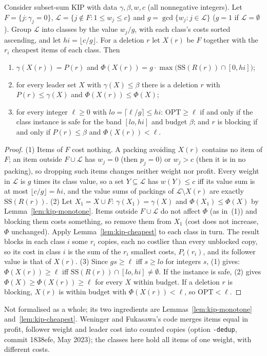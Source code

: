 \begin{proposition}\label{prop:kip-reduction}
Consider subset-sum KIP with data $\gamma,\beta,w,c$ (all nonnegative
integers). Let $F=\{j:\gamma_j=0\}$, $\mathcal{L}=\{j\notin F: 1\le w_j\le c\}$ and
$g=\gcd\{w_j: j\in\mathcal{L}\}$ ($g=1$ if $\mathcal{L}=\emptyset$). Group
$\mathcal{L}$ into classes by the value $w_j/g$, with each class's costs sorted
ascending, and let $hi=\lfloor c/g\rfloor$. For a deletion $r$ let $X(r)$ be $F$
together with the $r_i$ cheapest items of each class. Then
\begin{enumerate}
\item $\gamma(X(r))=P(r)$ and $\Phi(X(r))=g\cdot\max\bigl(\mathrm{SS}(R(r))\cap[0,hi]\bigr)$;
\item for every leader set $X$ with $\gamma(X)\le\beta$ there is a deletion $r$
with $P(r)\le\gamma(X)$ and $\Phi(X(r))\le\Phi(X)$;
\item for every integer $\ell\ge 0$ with $lo=\lceil\ell/g\rceil\le hi$:
$\mathrm{OPT}\ge\ell$ if and only if the class instance is safe for the band
$[lo,hi]$ and budget $\beta$; and $r$ is blocking if and only if
$P(r)\le\beta$ and $\Phi(X(r))<\ell$.
\end{enumerate}
\end{proposition}
\begin{proof}
(1) Items of $F$ cost nothing. A packing avoiding $X(r)$ contains no item of
$F$; an item outside $F\cup\mathcal{L}$ has $w_j=0$ (then $p_j=0$) or $w_j>c$ (then
it is in no packing), so dropping such items changes neither weight nor
profit. Every weight in $\mathcal{L}$ is $g$ times its class value, so a set
$Y\subseteq\mathcal{L}$ has $w(Y)\le c$ iff its value sum is at most
$\lfloor c/g\rfloor=hi$, and the value sums of packings of $\mathcal{L}\setminus X(r)$
are exactly $\mathrm{SS}(R(r))$.
(2) Let $X_1=X\cup F$: $\gamma(X_1)=\gamma(X)$ and $\Phi(X_1)\le\Phi(X)$ by
Lemma~\ref{lem:kip-monotone}. Items outside $F\cup\mathcal{L}$ do not affect $\Phi$
(as in~(1)) and blocking them costs something, so remove them from $X_1$
(cost does not increase, $\Phi$ unchanged). Apply Lemma~\ref{lem:kip-cheapest}
to each class in turn. The result blocks in each class $i$ some $r_i$ copies,
each no costlier than every unblocked copy, so its cost in class $i$ is the
sum of the $r_i$ smallest costs, $P_i(r_i)$, and its follower value is that
of $X(r)$.
(3) Since $g s\ge\ell$ iff $s\ge lo$ for integers $s$, (1) gives:
$\Phi(X(r))\ge\ell$ iff $\mathrm{SS}(R(r))\cap[lo,hi]\neq\emptyset$. If the instance is
safe, (2) gives $\Phi(X)\ge\Phi(X(r))\ge\ell$ for every $X$ within budget. If a
deletion $r$ is blocking, $X(r)$ is within budget with $\Phi(X(r))<\ell$, so
$\mathrm{OPT}<\ell$.
\end{proof}
\noindent Not formalised as a whole; its two ingredients are
Lemmas~\ref{lem:kip-monotone} and~\ref{lem:kip-cheapest}. Weninger and
Fukasawa's code merges items equal in profit, follower weight and leader cost
into counted copies (option \texttt{-dedup}, commit 1838efe, May
2023);\cite{weninger_bkpsolver} the classes here hold all items of one weight,
with different costs.

